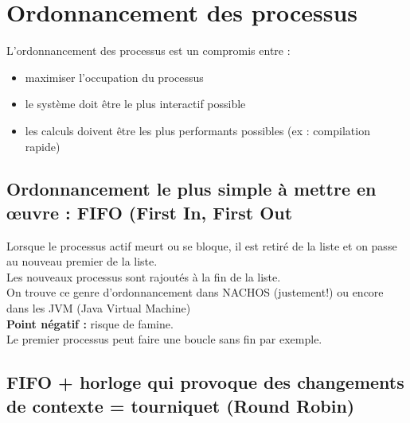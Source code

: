 \documentclass[12pt,a4paper]{report}
\begin{document}
\section{Ordonnancement des processus}
L'ordonnancement des processus est un compromis entre :
\begin{itemize}
\item maximiser l'occupation du processus
\item le système doit être le plus interactif possible
\item les calculs doivent être les plus performants possibles (ex : compilation rapide)
\end{itemize}

\medskip

\subsection{Ordonnancement le plus simple à mettre en œuvre : FIFO (First In, First Out}
\medskip
\begin{center}
\end{center}
\medskip

Lorsque le processus actif meurt ou se bloque, il est retiré de la liste et on passe au nouveau premier de la liste.\\
Les nouveaux processus sont rajoutés à la fin de la liste.\\
On trouve ce genre d'ordonnancement dans NACHOS (justement!) ou encore dans les JVM (Java Virtual Machine)\\

\textbf{Point négatif : } risque de famine.\\
Le premier processus peut faire une boucle sans fin par exemple.

\subsection{FIFO + horloge qui provoque des changements de contexte = tourniquet (Round Robin)}
\end{document}
